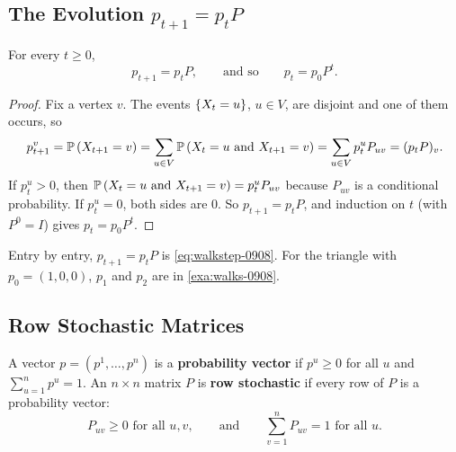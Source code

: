 \subsection{The Evolution \texorpdfstring{$p_{t+1} = p_t P$}{p(t+1) = p(t) P}}

\begin{lemma}\label{lem:evolution-0910}
    For every $t \geq 0$,
    \[p_{t+1} = p_t P, \qquad \text{and so} \qquad p_t = p_0 P^t.\]
\end{lemma}

\begin{proof}
    Fix a vertex $v$. The events $\left\lbrace X_t = u\right\rbrace$, $u \in V$, are disjoint and one of them occurs, so
    \[p_{t+1}^v = \prob{X_{t+1} = v} = \sum_{u \in V} \prob{X_t = u \text{ and } X_{t+1} = v}
        = \sum_{u \in V} p_t^u P_{uv} = (p_t P)_v.\]
    If $p_t^u > 0$, then $\prob{X_t = u \text{ and } X_{t+1} = v} = p_t^u P_{uv}$ because $P_{uv}$
    is a conditional probability. If $p_t^u = 0$, both sides are $0$. So $p_{t+1} = p_t P$, and
    induction on $t$ (with $P^0 = I$) gives $p_t = p_0 P^t$.
\end{proof}

Entry by entry, $p_{t+1} = p_t P$ is \cref{eq:walkstep-0908}. For the triangle with $p_0 = (1,0,0)$,
$p_1$ and $p_2$ are in \cref{exa:walks-0908}.

\subsection{Row Stochastic Matrices}

\begin{definition}\label{def:stochastic-0910}
    A vector $p = (p^1, \dots, p^n)$ is a \textbf{probability vector} if $p^u \geq 0$ for all $u$ and
    $\sum_{u=1}^{n} p^u = 1$. An $n \times n$ matrix $P$ is \textbf{row stochastic} if every row of $P$ is a
    probability vector:
    \[P_{uv} \geq 0 \text{ for all } u, v, \qquad \text{and} \qquad \sum_{v=1}^{n} P_{uv} = 1 \text{ for all } u.\]
\end{definition}

